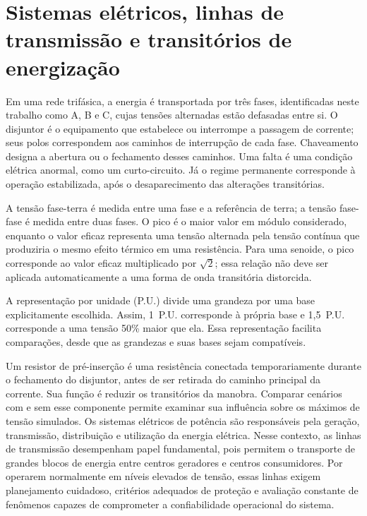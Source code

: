 \documentclass[
	12pt,				%
	openright,			%
	oneside,			%
	a4paper,			%
	chapter=TITLE,		%
	section=TITLE,		%
	subsection=TITLE,	%
	subsubsection=TITLE,%
	english,			%
	brazilian			%
	]{abntex2}
\theoremstyle{definition}
\begin{document}

\section{Sistemas elétricos, linhas de transmissão e transitórios de energização}

Em uma rede trifásica, a energia é transportada por três fases, identificadas
neste trabalho como A, B e C, cujas tensões alternadas estão defasadas entre
si. O disjuntor é o equipamento que estabelece ou interrompe a passagem de
corrente; seus polos correspondem aos caminhos de interrupção de cada fase.
Chaveamento designa a abertura ou o fechamento desses caminhos. Uma falta
é uma condição elétrica anormal, como um curto-circuito. Já o regime
permanente corresponde à operação estabilizada, após o desaparecimento
das alterações transitórias.

A tensão fase-terra é medida entre uma fase e a referência de terra;
a tensão fase-fase é medida entre duas fases. O pico é o maior valor em
módulo considerado, enquanto o valor eficaz representa uma tensão alternada
pela tensão contínua que produziria o mesmo efeito térmico em uma
resistência. Para uma senoide, o pico corresponde ao valor eficaz
multiplicado por $\sqrt{2}$; essa relação não deve ser aplicada
automaticamente a uma forma de onda transitória distorcida.

A representação por unidade (P.U.) divide uma grandeza por uma base
explicitamente escolhida. Assim, 1~P.U. corresponde à própria base e
1,5~P.U. corresponde a uma tensão 50\% maior que ela. Essa representação
facilita comparações, desde que as grandezas e suas bases sejam compatíveis.

Um resistor de pré-inserção é uma resistência conectada temporariamente
durante o fechamento do disjuntor, antes de ser retirada do caminho
principal da corrente. Sua função é reduzir os transitórios da manobra.
Comparar cenários com e sem esse componente permite examinar sua influência
sobre os máximos de tensão simulados.
Os sistemas elétricos de potência são responsáveis pela geração, transmissão, distribuição e utilização da energia elétrica. Nesse contexto, as linhas de transmissão desempenham papel fundamental, pois permitem o transporte de grandes blocos de energia entre centros geradores e centros consumidores. Por operarem normalmente em níveis elevados de tensão, essas linhas exigem planejamento cuidadoso, critérios adequados de proteção e avaliação constante de fenômenos capazes de comprometer a confiabilidade operacional do sistema.
\end{document}

